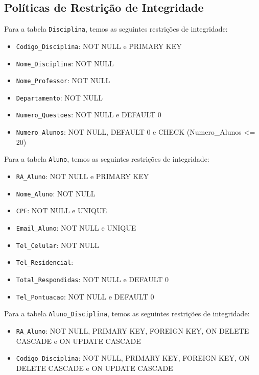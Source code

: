 \documentclass[12pt,a4paper]{article}
\begin{document}
\vspace{0.5cm}
\subsection{Políticas de Restrição de Integridade}
\vspace{0.5cm}
Para a tabela \texttt{Disciplina}, temos as seguintes restrições de integridade:

\begin{itemize}
    \item {\texttt{Codigo\_Disciplina}}: NOT NULL e PRIMARY KEY
    \item {\texttt{Nome\_Disciplina}}: NOT NULL
    \item {\texttt{Nome\_Professor}}: NOT NULL
    \item {\texttt{Departamento}}: NOT NULL
    \item {\texttt{Numero\_Questoes}}: NOT NULL e DEFAULT 0
    \item {\texttt{Numero\_Alunos}}: NOT NULL, DEFAULT 0 e CHECK (Numero\_Alunos <= 20) 
\end{itemize}

\vspace{0.5cm}
Para a tabela \texttt{Aluno}, temos as seguintes restrições de integridade:

\begin{itemize}
    \item {\texttt{RA\_Aluno}}: NOT NULL e PRIMARY KEY
    \item {\texttt{Nome\_Aluno}}: NOT NULL
    \item \texttt{CPF}: NOT NULL e UNIQUE
    \item \texttt{Email\_Aluno}: NOT NULL e UNIQUE
    \item \texttt{Tel\_Celular}: NOT NULL
    \item \texttt{Tel\_Residencial}:
    \item \texttt{Total\_Respondidas}: NOT NULL e DEFAULT 0
    \item \texttt{Tel\_Pontuacao}: NOT NULL e DEFAULT 0
\end{itemize}

\vspace{0.5cm}
Para a tabela \texttt{Aluno\_Disciplina}, temos as seguintes restrições de integridade:

\begin{itemize}
    \item {\texttt{RA\_Aluno}}: NOT NULL, PRIMARY KEY, FOREIGN KEY, ON DELETE CASCADE e ON UPDATE CASCADE
    \item {\texttt{Codigo\_Disciplina}}: NOT NULL, PRIMARY KEY, FOREIGN KEY, ON DELETE CASCADE e ON UPDATE CASCADE
\end{itemize}
\end{document}
